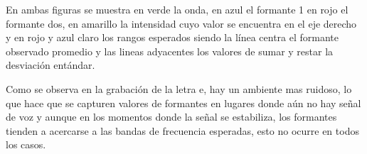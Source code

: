 En ambas figuras se muestra en verde la onda, en azul el formante 1 en rojo el formante dos, en amarillo la intensidad cuyo valor se encuentra en el eje derecho y en rojo y azul claro los rangos esperados siendo la línea centra el formante observado promedio y las lineas adyacentes los valores de sumar y restar la desviación entándar.

Como se observa en la grabación de la letra e, hay un ambiente mas ruidoso, lo que hace que se capturen valores de formantes en lugares donde aún no hay señal de voz y aunque en los momentos donde la señal se estabiliza, los formantes tienden a acercarse a las bandas de frecuencia esperadas, esto no ocurre en todos los casos.